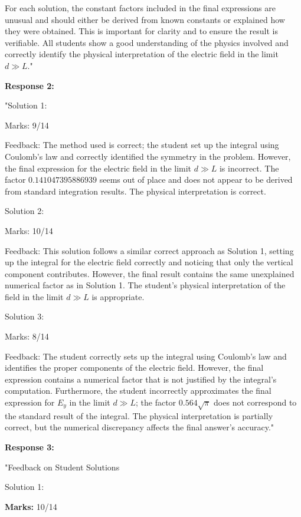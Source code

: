 \documentclass[a4paper,11pt]{article}
\begin{document}
\noindent For each solution, the constant factors included in the final expressions are unusual and should either be derived from known constants or explained how they were obtained. This is important for clarity and to ensure the result is verifiable. All students show a good understanding of the physics involved and correctly identify the physical interpretation of the electric field in the limit \( d \gg L \)."

\textbf{Response 2:}

"Solution 1:

Marks: 9/14

Feedback: The method used is correct; the student set up the integral using Coulomb's law and correctly identified the symmetry in the problem. However, the final expression for the electric field in the limit \( d \gg L \) is incorrect. The factor \(0.141047395886939\) seems out of place and does not appear to be derived from standard integration results. The physical interpretation is correct.

Solution 2:

Marks: 10/14

Feedback: This solution follows a similar correct approach as Solution 1, setting up the integral for the electric field correctly and noticing that only the vertical component contributes. However, the final result contains the same unexplained numerical factor as in Solution 1. The student's physical interpretation of the field in the limit \( d \gg L \) is appropriate.

Solution 3:

Marks: 8/14

Feedback: The student correctly sets up the integral using Coulomb's law and identifies the proper components of the electric field. However, the final expression contains a numerical factor that is not justified by the integral's computation. Furthermore, the student incorrectly approximates the final expression for \( E_y \) in the limit \( d \gg L \); the factor \( 0.564 \sqrt{\pi} \) does not correspond to the standard result of the integral. The physical interpretation is partially correct, but the numerical discrepancy affects the final answer's accuracy."

\textbf{Response 3:}

"Feedback on Student Solutions

Solution 1:

\textbf{Marks:} 10/14
\end{document}
